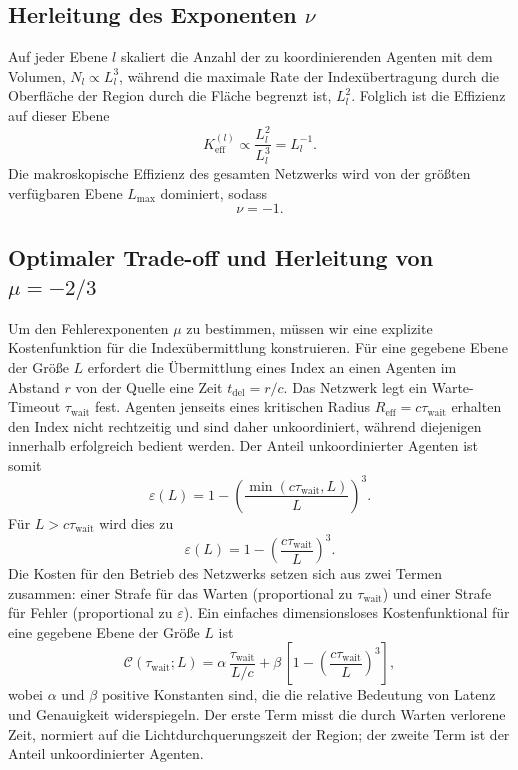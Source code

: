 \documentclass[11pt,a4paper]{article}
\begin{document}
	\subsection{Herleitung des Exponenten \(\nu\)}
	Auf jeder Ebene \(l\) skaliert die Anzahl der zu koordinierenden Agenten mit dem Volumen, \(N_l \propto L_l^3\), während die maximale Rate der Indexübertragung durch die Oberfläche der Region durch die Fläche begrenzt ist, \(L_l^2\). Folglich ist die Effizienz auf dieser Ebene
	\[
	K_{\mathrm{eff}}^{(l)} \propto \frac{L_l^2}{L_l^3} = L_l^{-1}.
	\]
	Die makroskopische Effizienz des gesamten Netzwerks wird von der größten verfügbaren Ebene \(L_{\max}\) dominiert, sodass
	\[
	\nu = -1. \label{eq:nu}
	\]
	
	\subsection{Optimaler Trade-off und Herleitung von \(\mu = -2/3\)}
	Um den Fehlerexponenten \(\mu\) zu bestimmen, müssen wir eine explizite Kostenfunktion für die Indexübermittlung konstruieren. Für eine gegebene Ebene der Größe \(L\) erfordert die Übermittlung eines Index an einen Agenten im Abstand \(r\) von der Quelle eine Zeit \(t_{\mathrm{del}} = r/c\). Das Netzwerk legt ein Warte-Timeout \(\tau_{\mathrm{wait}}\) fest. Agenten jenseits eines kritischen Radius \(R_{\mathrm{eff}} = c\tau_{\mathrm{wait}}\) erhalten den Index nicht rechtzeitig und sind daher unkoordiniert, während diejenigen innerhalb erfolgreich bedient werden. Der Anteil unkoordinierter Agenten ist somit
	\[
	\varepsilon(L) = 1 - \left(\frac{\min(c\tau_{\mathrm{wait}},L)}{L}\right)^3.
	\]
	Für \(L > c\tau_{\mathrm{wait}}\) wird dies zu
	\[
	\varepsilon(L) = 1 - \left(\frac{c\tau_{\mathrm{wait}}}{L}\right)^3.
	\]
	Die Kosten für den Betrieb des Netzwerks setzen sich aus zwei Termen zusammen: einer Strafe für das Warten (proportional zu \(\tau_{\mathrm{wait}}\)) und einer Strafe für Fehler (proportional zu \(\varepsilon\)). Ein einfaches dimensionsloses Kostenfunktional für eine gegebene Ebene der Größe \(L\) ist
	\begin{equation}
		\mathcal{C}(\tau_{\mathrm{wait}}; L) = \alpha\, \frac{\tau_{\mathrm{wait}}}{L/c} + \beta\,\left[1 - \left(\frac{c\tau_{\mathrm{wait}}}{L}\right)^3\right],
		\label{eq:cost}
	\end{equation}
	wobei \(\alpha\) und \(\beta\) positive Konstanten sind, die die relative Bedeutung von Latenz und Genauigkeit widerspiegeln. Der erste Term misst die durch Warten verlorene Zeit, normiert auf die Lichtdurchquerungszeit der Region; der zweite Term ist der Anteil unkoordinierter Agenten.
	
\end{document}
